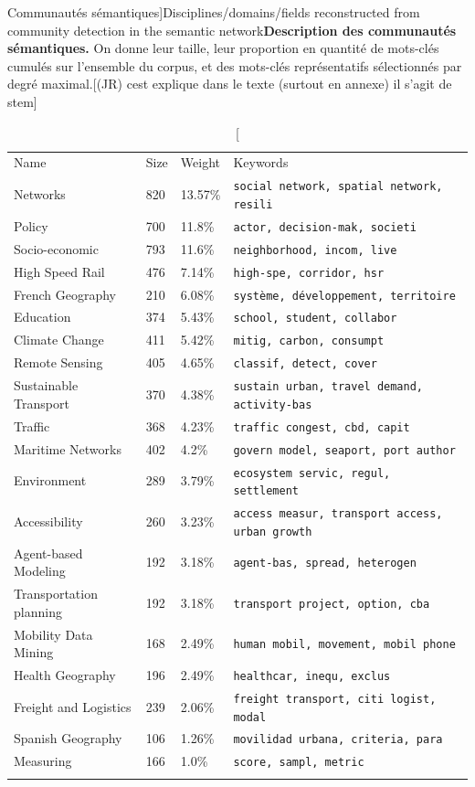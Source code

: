 \begin{table}
\caption[Semantic communities][Communautés sémantiques]{Disciplines/domains/fields reconstructed from community detection in the semantic network}{\textbf{Description des communautés sémantiques.} On donne leur taille, leur proportion en quantité de mots-clés cumulés sur l'ensemble du corpus, et des mots-clés représentatifs sélectionnés par degré maximal.[(JR) cest explique dans le texte (surtout en annexe) il s'agit de stem]}
\label{tab:quantepistemo:semanticdomains}
\begin{tabular}{llll}
\hline\noalign{\smallskip}
Name & Size & Weight & Keywords  \\
\noalign{\smallskip}\hline\noalign{\smallskip}
Networks & 820 & 13.57\% & \texttt{social network, spatial network, resili} \\
Policy & 700 & 11.8\% & \texttt{actor, decision-mak, societi} \\
Socio-economic & 793 & 11.6\% & \texttt{neighborhood, incom, live} \\
High Speed Rail & 476 & 7.14\% & \texttt{high-spe, corridor, hsr} \\
French Geography & 210 & 6.08\% & \texttt{système, développement, territoire} \\
Education & 374 & 5.43\% & \texttt{school, student, collabor} \\
Climate Change & 411 & 5.42\% & \texttt{mitig, carbon, consumpt} \\
Remote Sensing & 405 & 4.65\% & \texttt{classif, detect, cover} \\
Sustainable Transport & 370 & 4.38\% & \texttt{sustain urban, travel demand, activity-bas} \\
Traffic & 368 & 4.23\% & \texttt{traffic congest, cbd, capit} \\
Maritime Networks & 402 & 4.2\% & \texttt{govern model, seaport, port author} \\
Environment & 289 & 3.79\% & \texttt{ecosystem servic, regul, settlement} \\
Accessibility & 260 & 3.23\% & \texttt{access measur, transport access, urban growth} \\
Agent-based Modeling & 192 & 3.18\% & \texttt{agent-bas, spread, heterogen} \\
Transportation planning & 192 & 3.18\% & \texttt{transport project, option, cba} \\
Mobility Data Mining & 168 & 2.49\% & \texttt{human mobil, movement, mobil phone} \\
Health Geography & 196 & 2.49\% & \texttt{healthcar, inequ, exclus} \\
Freight and Logistics & 239 & 2.06\% & \texttt{freight transport, citi logist, modal} \\
Spanish Geography & 106 & 1.26\% & \texttt{movilidad urbana, criteria, para} \\
Measuring & 166 & 1.0\% & \texttt{score, sampl, metric} \\
\noalign{\smallskip}\hline
\end{tabular}
\end{table}



